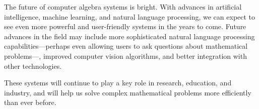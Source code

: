 The future of computer algebra systems is bright. With advances in artificial intelligence, machine learning, and natural language processing, we can expect to see even more powerful and user-friendly systems in the years to come. Future advances in the field may include more sophisticated natural language processing capabilities---perhaps even allowing users to ask questions about mathematical problems---, improved computer vision algorithms, and better integration with other technologies.

These systems will continue to play a key role in research, education, and industry, and will help us solve complex mathematical problems more efficiently than ever before.
